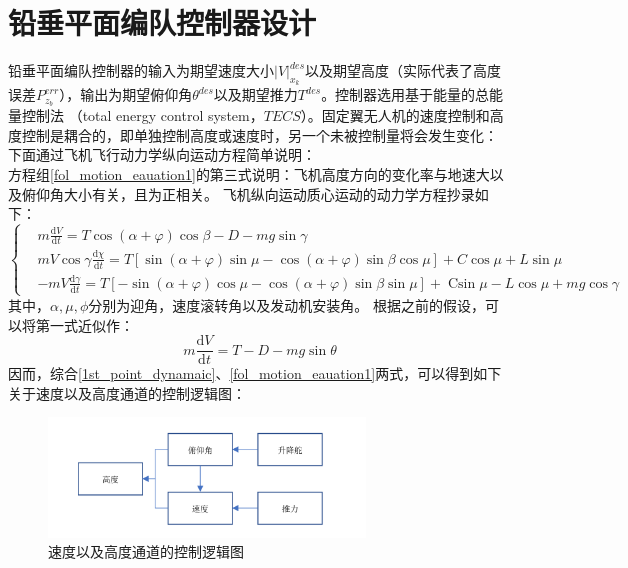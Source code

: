 \section{铅垂平面编队控制器设计}
铅垂平面编队控制器的输入为期望速度大小$|V|_{x_k}^{des}$以及期望高度（实际代表了高度误差$P_{z_b}^{err}$），输出为期望俯仰角$\theta^{des}$以及期望推力$T^{des}$。控制器选用基于能量的总能量控制法
（total energy control system，$TECS$）。固定翼无人机的速度控制和高度控制是耦合的，即单独控制高度或速度时，另一个未被控制量将会发生变化：
下面通过飞机飞行动力学纵向运动方程简单说明：
\\方程组\ref{fol_motion_eauation1}的第三式说明：飞机高度方向的变化率与地速大以及俯仰角大小有关，且为正相关。
飞机纵向运动质心运动的动力学方程抄录如下：
\begin{equation}
    \left\{
    \begin{aligned}
    &m \frac{\mathrm{d} V}{\mathrm{d} t}=T \cos (\alpha+\varphi) \cos \beta-D-m g \sin \gamma\\
    &m V \cos \gamma \frac{\mathrm{d} \chi}{\mathrm{d} t}=T[\sin (\alpha+\varphi) \sin \mu-\cos (\alpha+\varphi) \sin \beta \cos \mu]+C \cos \mu+L \sin \mu\\
    &-m V \frac{\mathrm{d} \gamma}{\mathrm{d} t}=T[-\sin (\alpha+\varphi) \cos \mu-\cos (\alpha+\varphi) \sin \beta \sin \mu]+\operatorname{Csin} \mu-L \cos \mu+m g \cos \gamma
    \end{aligned}
    \right .
    \label{point_dynamaic}
\end{equation}
其中，$\alpha,\mu,\phi$分别为迎角，速度滚转角以及发动机安装角。
根据之前的假设，可以将第一式近似作：
\begin{equation}
    m \frac{\mathrm{d} V}{\mathrm{d} t}=T-D-m g \sin \theta
    \label{1st_point_dynamaic}
\end{equation}
因而，综合\ref{1st_point_dynamaic}、\ref{fol_motion_eauation1}两式，可以得到如下关于速度以及高度通道的控制逻辑图：
\begin{figure}[H]
    \centering
    \includegraphics[width=0.75\textwidth]{figures/c3/relation_theta_thrust}
    \caption{速度以及高度通道的控制逻辑图}\label{fig:relation_theta_thrust}
\end{figure}
